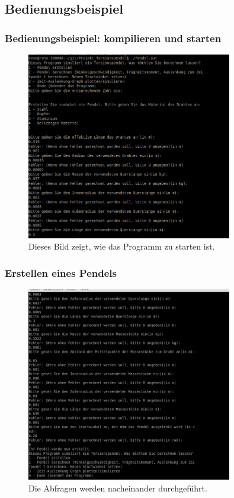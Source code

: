 \documentclass[11pt]{beamer}
\begin{document}
\subsection{Bedienungsbeispiel}
\begin{frame}
\frametitle{Bedienungsbeispiel: kompilieren und starten}
\begin{figure} [H]
\centering
\includegraphics[width=0.8\textwidth]{Teil_a.jpg}
\caption{Dieses Bild zeigt, wie das Programm zu starten ist.}
\end{figure}
\end{frame}

\begin{frame}
\frametitle{Erstellen eines Pendels}
\begin{figure} [H]
\centering
\includegraphics[width=0.8\textwidth]{Teil_b.jpg}
\caption{Die Abfragen werden nacheinander durchgeführt.}
\end{figure}
\end{frame}
\end{document}

